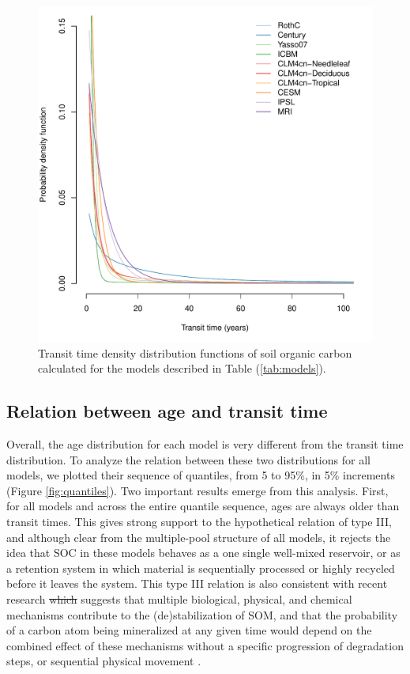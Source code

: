 \documentclass[draft,linenumbers]{agujournal}
\providecommand{\DIFadd}[1]{{\protect\color{blue}\uwave{#1}}} %
\providecommand{\DIFdel}[1]{{\protect\color{red}\sout{#1}}}                      %
\providecommand{\DIFaddbegin}{} %
\providecommand{\DIFaddend}{} %
\providecommand{\DIFdelbegin}{} %
\providecommand{\DIFdelend}{} %
\begin{document}
\DIFaddend \begin{figure}[t]
   \centering
   \includegraphics[scale=0.75]{Figures/modelsTT} %
   \caption{Transit time density distribution functions of soil organic carbon calculated for the models described in Table (\ref{tab:models}).}
   \label{fig:ttDensity}
\end{figure}

\subsection{Relation between age and transit time}
Overall, the age distribution for each model is very different from the transit time distribution. To analyze the relation between these two distributions for all models, we plotted their sequence of  quantiles, from 5 to 95\%, in 5\% increments (Figure \ref{fig:quantiles}). Two important results emerge from this analysis. First, for all models and across the entire quantile sequence, ages are always older than transit times. This gives strong support to the hypothetical relation of type III, and although clear from the multiple-pool structure of all models, it  rejects the idea that SOC in these models behaves as a one single well-mixed reservoir, or as a retention system in which material is sequentially processed or highly recycled before it leaves the system. This type III relation is also consistent with recent research \DIFdelbegin \DIFdel{which }\DIFdelend \DIFaddbegin \DIFadd{that }\DIFaddend suggests that multiple biological, physical, and chemical mechanisms contribute to the (de)stabilization of SOM, and that the probability of a carbon atom being mineralized at any given time would depend on the combined effect of these mechanisms without a specific progression of degradation steps, or sequential physical movement \citep{LehmannKleber}. 
\end{document}
